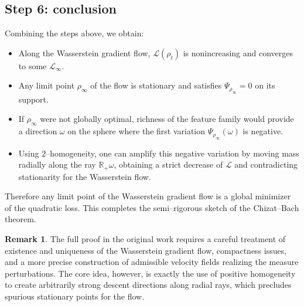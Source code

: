 \documentclass[11pt]{article}
\numberwithin{equation}{section}
\theoremstyle{definition}
\newtheorem{remark}{Remark}[section]
\newcommand{\R}{\mathbb{R}}
\newcommand{\1}{\mathbbm{1}}
\begin{document}
\subsection{Step 6: conclusion}

Combining the steps above, we obtain:

\begin{itemize}
\item Along the Wasserstein gradient flow, $\mathcal{L}(\rho_t)$ is nonincreasing and converges to some $\mathcal{L}_\infty$.
\item Any limit point $\rho_\infty$ of the flow is stationary and satisfies $\Psi_{\rho_\infty}=0$ on its support.
\item If $\rho_\infty$ were not globally optimal, richness of the feature family would provide a direction $\omega$ on the sphere where the first variation $\Psi_{\rho_\infty}(\omega)$ is negative.
\item Using $2$--homogeneity, one can amplify this negative variation by moving mass radially along the ray $\R_+\omega$, obtaining a strict decrease of $\mathcal{L}$ and contradicting stationarity for the Wasserstein flow.
\end{itemize}

Therefore any limit point of the Wasserstein gradient flow is a global minimizer of the quadratic loss. This completes the semi--rigorous sketch of the Chizat--Bach theorem.

\begin{remark}
The full proof in the original work requires a careful treatment of existence and uniqueness of the Wasserstein gradient flow, compactness issues, and a more precise construction of admissible velocity fields realizing the measure perturbations. The core idea, however, is exactly the use of positive homogeneity to create arbitrarily strong descent directions along radial rays, which precludes spurious stationary points for the flow.
\end{remark}
\end{document}
